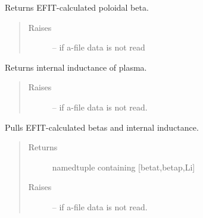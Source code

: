\documentclass[letterpaper,10pt,english]{sphinxmanual}
\begin{document}
\begin{fulllineitems}
\begin{fulllineitems}
\begin{quote}
\begin{description}
\end{description}\end{quote}

\end{fulllineitems}


\begin{fulllineitems}
\label{eqtools:eqtools.eqdskreader.EqdskReader.getBetaP}
Returns EFIT-calculated poloidal beta.
\begin{quote}\begin{description}
\item[{Raises}] \leavevmode
{} -- if a-file data is not read

\end{description}\end{quote}

\end{fulllineitems}


\begin{fulllineitems}
\label{eqtools:eqtools.eqdskreader.EqdskReader.getLi}
Returns internal inductance of plasma.
\begin{quote}\begin{description}
\item[{Raises}] \leavevmode
{} -- if a-file data is not read.

\end{description}\end{quote}

\end{fulllineitems}


\begin{fulllineitems}
\label{eqtools:eqtools.eqdskreader.EqdskReader.getBetas}
Pulls EFIT-calculated betas and internal inductance.
\begin{quote}\begin{description}
\item[{Returns}] \leavevmode
namedtuple containing {[}betat,betap,Li{]}

\item[{Raises}] \leavevmode
{} -- if a-file data is not read.


\end{description}
\end{quote}
\end{fulllineitems}
\end{fulllineitems}
\end{document}
